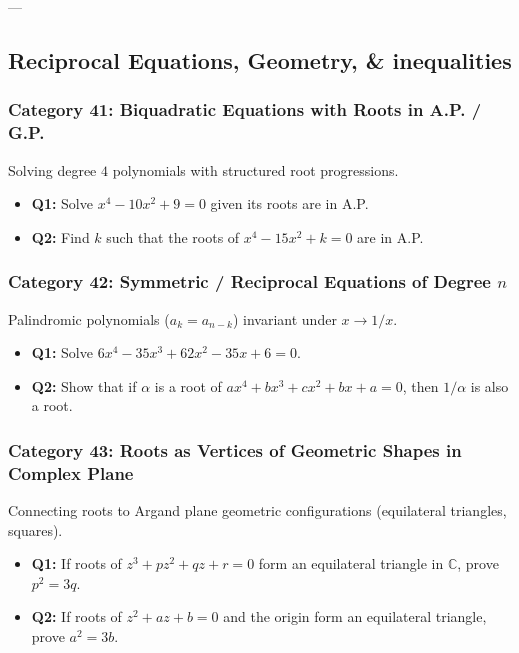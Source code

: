 \documentclass[10pt,a4paper]{article}
\begin{document}
---

\subsection{Reciprocal Equations, Geometry, \& inequalities}

\subsubsection{Category 41: Biquadratic Equations with Roots in A.P. / G.P.}
Solving degree $4$ polynomials with structured root progressions.
\begin{itemize}[leftmargin=*]
    \item \textbf{Q1:} Solve $x^4 - 10x^2 + 9 = 0$ given its roots are in A.P.
    \item \textbf{Q2:} Find $k$ such that the roots of $x^4 - 15x^2 + k = 0$ are in A.P.
\end{itemize}

\subsubsection{Category 42: Symmetric / Reciprocal Equations of Degree $n$}
Palindromic polynomials ($a_k = a_{n-k}$) invariant under $x \to 1/x$.
\begin{itemize}[leftmargin=*]
    \item \textbf{Q1:} Solve $6x^4 - 35x^3 + 62x^2 - 35x + 6 = 0$.
    \item \textbf{Q2:} Show that if $\alpha$ is a root of $ax^4 + bx^3 + cx^2 + bx + a = 0$, then $1/\alpha$ is also a root.
\end{itemize}

\subsubsection{Category 43: Roots as Vertices of Geometric Shapes in Complex Plane}
Connecting roots to Argand plane geometric configurations (equilateral triangles, squares).
\begin{itemize}[leftmargin=*]
    \item \textbf{Q1:} If roots of $z^3 + pz^2 + qz + r = 0$ form an equilateral triangle in $\mathbb{C}$, prove $p^2 = 3q$.
    \item \textbf{Q2:} If roots of $z^2 + az + b = 0$ and the origin form an equilateral triangle, prove $a^2 = 3b$.
\end{itemize}
\end{document}
